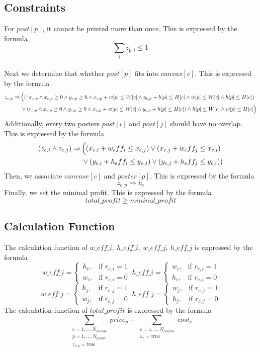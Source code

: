 \documentclass{article}
\begin{document}
\subsection{Constraints}
For $post[p]$, it cannot be printed more than once. This is expressed by the formula
\[
\sum_i z_{p,i} \leq 1
\]
\\Next we determine that whether $post[p]$ fits into $canvas[c]$. This is expressed by the formula 
\begin{align*}
z_{c,p} \Rightarrow \, 
& \Bigl( (\lnot r_{c,p} \wedge x_{c,p} \ge 0 \wedge y_{c,p} \ge 0 \wedge x_{c,p} + w[p] \le W[c] \wedge y_{c,p} + h[p] \le H[c] \wedge w[p] \le W[c] \wedge h[p] \le H[c]) \nonumber\\
& \vee ( r_{c,p} \wedge x_{c,p} \ge 0 \wedge y_{c,p} \ge 0 \wedge x_{c,p} + w[p] \le W[c] \wedge y_{c,p} + h[p] \le H[c]) \wedge h[p] \le W[c] \wedge w[p] \le H[c] \Bigr)
\end{align*}
Additionally, every two posters $post[i]$ and $post[j]$ should have no overlap. This is expressed by the formula
\begin{align*}
(z_{c,i} \wedge z_{c,j}) \Rightarrow \, 
& \Bigl( (x_{c,i} + w_eff_i \le x_{c,j} ) \vee (x_{c,j} + w_eff_j \le x_{c,i} ) \nonumber\\
& \vee(y_{c,i} + h_eff_i \le y_{c,j} ) \vee (y_{c,j} + h_eff_j \le y_{c,i} ))
\end{align*}
Then, we associate $canvase[c]$ and $poster[p]$. This is expressed by the formula
\[
z_{c,p} \Rightarrow u_c
\]
Finally, we set the minimal profit. This is expressed by the formula
\[
total\_profit \ge mininal\_profit
\]

\subsection{Calculation Function}
The calculation function of $w\_eff\_i, \ h\_eff\_i, \ w\_eff\_j, \ h\_eff\_j$ is expressed by the formula
\[
w\_eff\_i =
\begin{cases}
h_i, & \text{if } r_{c,i} = 1 \\[4pt]
w_i, & \text{if } r_{c,i} = 0
\end{cases}
\ h\_eff\_i =
\begin{cases}
w_i, & \text{if } r_{c,i} = 1 \\[4pt]
h_i, & \text{if } r_{c,i} = 0
\end{cases}
\]
\[
w\_eff\_j =
\begin{cases}
h_j, & \text{if } r_{c,j} = 1 \\[4pt]
w_j, & \text{if } r_{c,j} = 0
\end{cases}
\ h\_eff\_j =
\begin{cases}
w_j, & \text{if } r_{c,j} = 1 \\[4pt]
h_j, & \text{if } r_{c,j} = 0
\end{cases}
\]
The calculation function of $total\_profit$ is expressed by the formula
\[
\sum_{\substack{c=1,\dots,N_{\text{canvas}} \\ p=1,\dots,N_{\text{poster}} \\ z_{c,p} = \text{true}}} price_p - \sum_{\substack{c=1,\dots,N_{\text{canvas}} \\ u_c = \text{true}}} cost_c
\]
\end{document}
